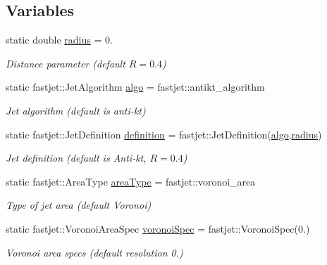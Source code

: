 \subsection*{Variables}
\begin{DoxyCompactItemize}
\item 
static double \hyperlink{namespaceAnalysis_1_1Config_1_1JetFinder_af8dfcbb2cc7b1fd0d76546cc4b2984bd}{radius} = 0.
\begin{DoxyCompactList}\small\item\em Distance parameter (default $ R = 0.4 $) \end{DoxyCompactList}\item 
static fastjet\+::\+Jet\+Algorithm \hyperlink{namespaceAnalysis_1_1Config_1_1JetFinder_abce841a2f75b96e943dc5e2be875765b}{algo} = fastjet\+::antikt\+\_\+algorithm
\begin{DoxyCompactList}\small\item\em Jet algorithm (default is anti-\/kt) \end{DoxyCompactList}\item 
static fastjet\+::\+Jet\+Definition \hyperlink{namespaceAnalysis_1_1Config_1_1JetFinder_aba0bf7a22523481843fb40dd34488c8c}{definition} = fastjet\+::\+Jet\+Definition(\hyperlink{namespaceAnalysis_1_1Config_1_1JetFinder_abce841a2f75b96e943dc5e2be875765b}{algo},\hyperlink{namespaceAnalysis_1_1Config_1_1JetFinder_af8dfcbb2cc7b1fd0d76546cc4b2984bd}{radius})
\begin{DoxyCompactList}\small\item\em Jet definition (default is Anti-\/kt, $ R = 0.4 $) \end{DoxyCompactList}\item 
static fastjet\+::\+Area\+Type \hyperlink{namespaceAnalysis_1_1Config_1_1JetFinder_a42b6e6b7c1bebe8646790c377d569664}{area\+Type} = fastjet\+::voronoi\+\_\+area
\begin{DoxyCompactList}\small\item\em Type of jet area (default Voronoi) \end{DoxyCompactList}\item 
static fastjet\+::\+Voronoi\+Area\+Spec \hyperlink{namespaceAnalysis_1_1Config_1_1JetFinder_a63a996b81ad4a7216c5652fb216c0ed2}{voronoi\+Spec} = fastjet\+::\+Voronoi\+Spec(0.)
\begin{DoxyCompactList}\small\item\em Voronoi area specs (default resolution 0.) \end{DoxyCompactList}\item 

\end{DoxyCompactItemize}
